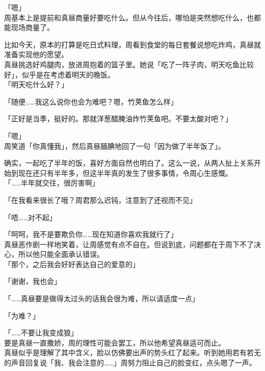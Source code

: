 「嗯」\\

周基本上是提前和真昼商量好要吃什么。但从今往后，哪怕是突然想吃什么，也都能现场商量了。

比如今天，原本的打算是吃日式料理，周看到食堂的每日套餐说想吃炸鸡，真昼就准备实现他的愿望。\\

真昼挑选好鸡腿肉，放进周抱着的篮子里。她说「吃了一阵子肉，明天吃鱼比较好」，似乎是在考虑着明天的晚饭。\\

「明天吃什么好？」

「随便……我这么说你也会为难吧？嗯，竹荚鱼怎么样」

「正好是当季，挺好的。那就洋葱醋腌油炸竹荚鱼吧。不要太酸对吧？」

「嗯」\\

周笑道「你真懂我」，然后真昼腼腆地回了一句「因为做了半年饭了」。

确实，一起吃了半年的饭，喜好方面自然也明白了。这么一说，从两人扯上关系开始到现在还只有半年多，但这半年真的发生了很多事情，令周心生感慨。\\

「……半年就交往，很厉害啊」

「在我看来很长了哦？周君那么迟钝，注意到了还视而不见」

「唔……对不起」

「呵呵，我不是要欺负你……现在知道你喜欢我就行了」\\

真昼恶作剧一样地笑着，让周感觉有点不自在。但说到底，问题都在于周下不了决心，所以他只能全面承认错误。\\

「那个，之后我会好好表达自己的爱意的」

「谢谢，我也会」

「……真昼要是做得太过头的话我会很为难，所以请适度一点」

「为难？」

「……不要让我变成狼」\\

要是真昼一直撒娇，周的理性可能会罢工，所以他希望真昼适可而止。\\

真昼似乎是理解了其中含义，脸以仿佛要出声的势头红了起来。听到她用若有若无的声音回复说「我、我会注意的……」周努力阻止自己的脸变红，点头嗯了一声。

